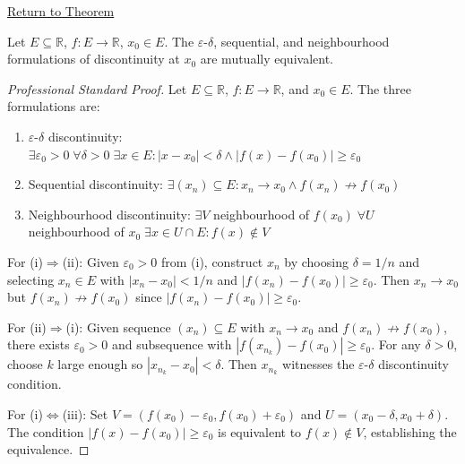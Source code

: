 \newpage
{}
\label{prf:equivalent-discontinuity-at-a-point}

\begin{remark*}[Return]
\hyperref[lem:equivalent-discontinuity-at-a-point]{Return to Theorem}
\end{remark*}

\begin{lemma*}
Let $E \subseteq \mathbb{R}$, $f : E \to \mathbb{R}$, $x_0 \in E$. The $\varepsilon$-$\delta$, sequential, and neighbourhood formulations of discontinuity at $x_0$ are mutually equivalent.
\end{lemma*}

\begin{proof}[Professional Standard Proof]
\LRAProofBodyStart
Let $E \subseteq \mathbb{R}$, $f : E \to \mathbb{R}$, and $x_0 \in E$. The three formulations are:
\begin{enumerate}[label=\textup{(\roman*)}]
\item $\varepsilon$-$\delta$ discontinuity: $\exists \varepsilon_0>0\;\forall \delta>0\;\exists x\in E: |x-x_0|<\delta \wedge |f(x)-f(x_0)|\ge \varepsilon_0$
\item Sequential discontinuity: $\exists (x_n) \subseteq E: x_n\to x_0 \wedge f(x_n)\not\to f(x_0)$
\item Neighbourhood discontinuity: $\exists V$ neighbourhood of $f(x_0)\;\forall U$ neighbourhood of $x_0\;\exists x\in U\cap E: f(x)\notin V$
\end{enumerate}

For (i)$\Rightarrow$(ii): Given $\varepsilon_0>0$ from (i), construct $x_n$ by choosing $\delta=1/n$ and selecting $x_n \in E$ with $|x_n-x_0|<1/n$ and $|f(x_n)-f(x_0)|\ge \varepsilon_0$. Then $x_n\to x_0$ but $f(x_n)\not\to f(x_0)$ since $|f(x_n)-f(x_0)|\ge \varepsilon_0$.

For (ii)$\Rightarrow$(i): Given sequence $(x_n) \subseteq E$ with $x_n\to x_0$ and $f(x_n)\not\to f(x_0)$, there exists $\varepsilon_0>0$ and subsequence with $|f(x_{n_k})-f(x_0)|\ge \varepsilon_0$. For any $\delta>0$, choose $k$ large enough so $|x_{n_k}-x_0|<\delta$. Then $x_{n_k}$ witnesses the $\varepsilon$-$\delta$ discontinuity condition.

For (i)$\Leftrightarrow$(iii): Set $V=(f(x_0)-\varepsilon_0, f(x_0)+\varepsilon_0)$ and $U=(x_0-\delta, x_0+\delta)$. The condition $|f(x)-f(x_0)|\ge \varepsilon_0$ is equivalent to $f(x)\notin V$, establishing the equivalence.
\end{proof}

